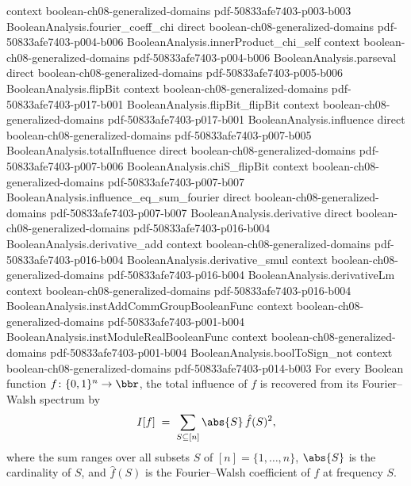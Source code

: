 \begin{theorem}
  {context}
  {boolean-ch08-generalized-domains}
  {pdf-50833afe7403-p003-b003}
\proofstep
  {BooleanAnalysis.fourier_coeff_chi}
  {direct}
  {boolean-ch08-generalized-domains}
  {pdf-50833afe7403-p004-b006}
\proofstep
  {BooleanAnalysis.innerProduct_chi_self}
  {context}
  {boolean-ch08-generalized-domains}
  {pdf-50833afe7403-p004-b006}
\proofstep
  {BooleanAnalysis.parseval}
  {direct}
  {boolean-ch08-generalized-domains}
  {pdf-50833afe7403-p005-b006}
\proofstep
  {BooleanAnalysis.flipBit}
  {context}
  {boolean-ch08-generalized-domains}
  {pdf-50833afe7403-p017-b001}
\proofstep
  {BooleanAnalysis.flipBit_flipBit}
  {context}
  {boolean-ch08-generalized-domains}
  {pdf-50833afe7403-p017-b001}
\proofstep
  {BooleanAnalysis.influence}
  {direct}
  {boolean-ch08-generalized-domains}
  {pdf-50833afe7403-p007-b005}
\proofstep
  {BooleanAnalysis.totalInfluence}
  {direct}
  {boolean-ch08-generalized-domains}
  {pdf-50833afe7403-p007-b006}
\proofstep
  {BooleanAnalysis.chiS_flipBit}
  {context}
  {boolean-ch08-generalized-domains}
  {pdf-50833afe7403-p007-b007}
\proofstep
  {BooleanAnalysis.influence_eq_sum_fourier}
  {direct}
  {boolean-ch08-generalized-domains}
  {pdf-50833afe7403-p007-b007}
\proofstep
  {BooleanAnalysis.derivative}
  {direct}
  {boolean-ch08-generalized-domains}
  {pdf-50833afe7403-p016-b004}
\proofstep
  {BooleanAnalysis.derivative_add}
  {context}
  {boolean-ch08-generalized-domains}
  {pdf-50833afe7403-p016-b004}
\proofstep
  {BooleanAnalysis.derivative_smul}
  {context}
  {boolean-ch08-generalized-domains}
  {pdf-50833afe7403-p016-b004}
\proofstep
  {BooleanAnalysis.derivativeLm}
  {context}
  {boolean-ch08-generalized-domains}
  {pdf-50833afe7403-p016-b004}
\proofstep
  {BooleanAnalysis.instAddCommGroupBooleanFunc}
  {context}
  {boolean-ch08-generalized-domains}
  {pdf-50833afe7403-p001-b004}
\proofstep
  {BooleanAnalysis.instModuleRealBooleanFunc}
  {context}
  {boolean-ch08-generalized-domains}
  {pdf-50833afe7403-p001-b004}
\proofstep
  {BooleanAnalysis.boolToSign_not}
  {context}
  {boolean-ch08-generalized-domains}
  {pdf-50833afe7403-p014-b003}
For every Boolean function $f\colon\{0,1\}^n\to\bbr$, the total influence of $f$ is
recovered from its Fourier--Walsh spectrum by
\[
  I[f] \;=\; \sum_{S\subseteq[n]} \abs{S}\,\hat f(S)^2,
\]
where the sum ranges over all subsets $S$ of $[n]=\{1,\dots,n\}$, $\abs{S}$ is the
cardinality of $S$, and $\hat f(S)$ is the Fourier--Walsh coefficient of $f$ at
frequency $S$.
\end{theorem}

